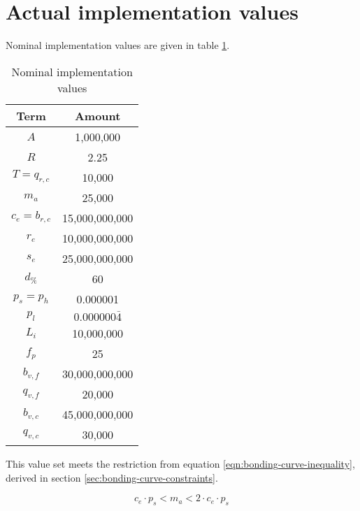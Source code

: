 \documentclass[table, twocolumn]{article}
\begin{document}
\section{Actual implementation values}

Nominal implementation values are given in table
\ref{tab:nominal-implementation-values}.

\begin{table}[!htb]
  \centering
  \begin{tabular}{|c|c|}
    \hline \rowcolor{blue}
    Term             & Amount            \\ \hline
    $A$              & 1,000,000         \\ \hline
    $R$              & 2.25              \\ \hline
    $T = q_{r ,c}$   & 10,000            \\ \hline
    $m_a$            & 25,000            \\ \hline
    $c_e = b_{r, c}$ & 15,000,000,000    \\ \hline
    $r_e$            & 10,000,000,000    \\ \hline
    $s_e$            & 25,000,000,000    \\ \hline
    $d_\%$           & 60                \\ \hline
    $p_s = p_h$      & 0.000001          \\ \hline
    \rule{0pt}{10pt} %
    $p_l$            & $0.000000\bar{4}$ \\ \hline
    $L_i$            & 10,000,000        \\ \hline
    $f_p$            & 25                \\ \hline
    $b_{v, f}$       & 30,000,000,000    \\ \hline
    $q_{v, f}$       & 20,000            \\ \hline
    $b_{v, c}$       & 45,000,000,000    \\ \hline
    $q_{v, c}$       & 30,000            \\ \hline
  \end{tabular}
  \caption{Nominal implementation values}
  \label{tab:nominal-implementation-values}
\end{table}

This value set meets the restriction from equation \ref{eqn:bonding-curve-inequality},
derived in section \ref{sec:bonding-curve-constraints}.

\begin{equation} \label{eqn:bonding-curve-inequality}
  c_e \cdot p_s < m_a < 2 \cdot c_e \cdot p_s
\end{equation}
\end{document}

